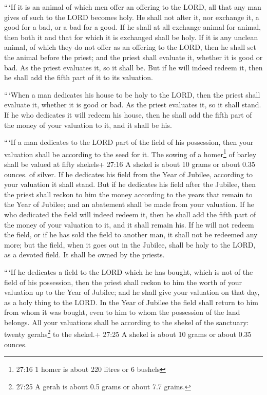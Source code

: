  ``\,`If it is an animal of which men offer an offering to
the LORD, all that any man gives of such to the LORD becomes holy.
 He shall not alter it, nor exchange it, a good for a bad,
or a bad for a good. If he shall at all exchange animal for animal, then
both it and that for which it is exchanged shall be holy. 
If it is any unclean animal, of which they do not offer as an offering
to the LORD, then he shall set the animal before the priest;
 and the priest shall evaluate it, whether it is good or
bad. As the priest evaluates it, so it shall be.  But if he
will indeed redeem it, then he shall add the fifth part of it to its
valuation.

 ``\,`When a man dedicates his house to be holy to the
LORD, then the priest shall evaluate it, whether it is good or bad. As
the priest evaluates it, so it shall stand.  If he who
dedicates it will redeem his house, then he shall add the fifth part of
the money of your valuation to it, and it shall be his.

 ``\,`If a man dedicates to the LORD part of the field of
his possession, then your valuation shall be according to the seed for
it. The sowing of a homer\footnote{27:16 1 homer is about 220 litres or
  6 bushels} of barley shall be valued at fifty shekels+ 27:16 A shekel
is about 10 grams or about 0.35 ounces. of silver.  If he
dedicates his field from the Year of Jubilee, according to your
valuation it shall stand.  But if he dedicates his field
after the Jubilee, then the priest shall reckon to him the money
according to the years that remain to the Year of Jubilee; and an
abatement shall be made from your valuation.  If he who
dedicated the field will indeed redeem it, then he shall add the fifth
part of the money of your valuation to it, and it shall remain his.
 If he will not redeem the field, or if he has sold the
field to another man, it shall not be redeemed any more; 
but the field, when it goes out in the Jubilee, shall be holy to the
LORD, as a devoted field. It shall be owned by the priests.

 ``\,`If he dedicates a field to the LORD which he has
bought, which is not of the field of his possession,  then
the priest shall reckon to him the worth of your valuation up to the
Year of Jubilee; and he shall give your valuation on that day, as a holy
thing to the LORD.  In the Year of Jubilee the field shall
return to him from whom it was bought, even to him to whom the
possession of the land belongs.  All your valuations shall
be according to the shekel of the sanctuary: twenty gerahs\footnote{27:25
  A gerah is about 0.5 grams or about 7.7 grains.} to the shekel.+ 27:25
A shekel is about 10 grams or about 0.35 ounces.

